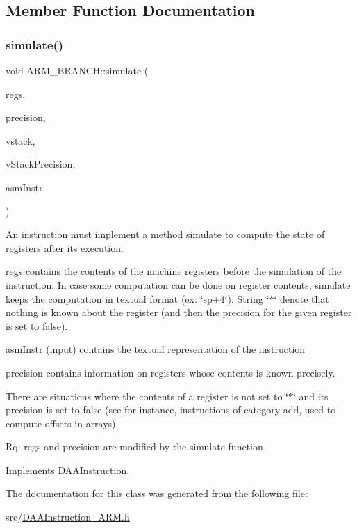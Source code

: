 \subsection{Member Function Documentation}
\mbox{\label{classARM__BRANCH_aa0d9c3dd00b171810002e84021435ff1}} 
\subsubsection{\texorpdfstring{simulate()}{simulate()}}
{\footnotesize\ttfamily void A\+R\+M\+\_\+\+B\+R\+A\+N\+C\+H\+::simulate (\begin{DoxyParamCaption}\item[{\hyperlink{DAAInstruction_8h_af0fae93a861de9cf37988d5673cac523}{reg\+Table} \&}]{regs,  }\item[{\hyperlink{DAAInstruction_8h_a0e8cae02815a5f8adc750122d790b455}{reg\+Precision\+Table} \&}]{precision,  }\item[{\hyperlink{DAAInstruction_8h_a1b0e70ac1a04f06c8132055ed01f589f}{stack\+Type} \&}]{vstack,  }\item[{\hyperlink{DAAInstruction_8h_ac5cb793e9dac3fa9693da78b7e29ab30}{stack\+Prec\+Type} \&}]{v\+Stack\+Precision,  }\item[{const string \&}]{asm\+Instr }\end{DoxyParamCaption})\hspace{0.3cm}{\ttfamily [virtual]}}

An instruction must implement a method simulate to compute the state of registers after its execution.

regs contains the contents of the machine registers before the simulation of the instruction. In case some computation can be done on register contents, simulate keeps the computation in textual format (ex\+: \char`\"{}sp+4\char`\"{}). String \char`\"{}$\ast$\char`\"{} denote that nothing is known about the register (and then the precision for the given register is set to false).

asm\+Instr (input) contains the textual representation of the instruction

precision contains information on registers whose contents is known precisely.

There are situations where the contents of a register is not set to \char`\"{}$\ast$\char`\"{} and its precision is set to false (see for instance, instructions of category add, used to compute offsets in arrays)

Rq\+: regs and precision are modified by the simulate function 

Implements \hyperlink{classDAAInstruction_a61d0b9bece1e0ead89a46c0197276324}{D\+A\+A\+Instruction}.



The documentation for this class was generated from the following file\+:\begin{DoxyCompactItemize}
\item 
src/\hyperlink{DAAInstruction__ARM_8h}{D\+A\+A\+Instruction\+\_\+\+A\+R\+M.\+h}\end{DoxyCompactItemize}
